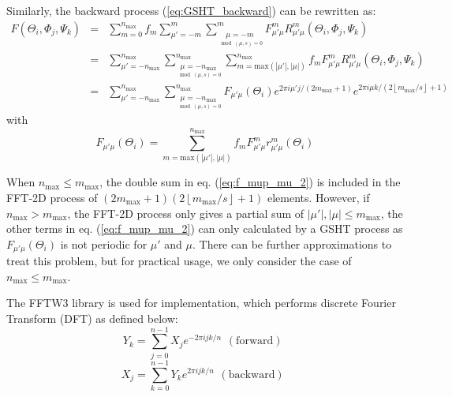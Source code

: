 Similarly, the backward process (\ref{eq:GSHT_backward}) can be rewritten
as:
\begin{eqnarray}
F(\Theta_{i},\Phi_{j},\Psi_{k}) & = & \sum_{m=0}^{n_{\mathrm{max}}}f_{m}\sum_{\mu'=-m}^{m}\sum_{\underset{\mod(\mu,s)=0}{\mu=-m}}^{m}F_{\mu'\mu}^{m}R_{\mu'\mu}^{m}(\Theta_{i},\Phi_{j},\Psi_{k})\label{eq:f_mup_mu_2}\\
 & = & \sum_{\mu'=-n_{\mathrm{max}}}^{n_{\mathrm{max}}}\sum_{\underset{\mod(\mu,s)=0}{\mu=-n_{\mathrm{max}}}}^{n_{\mathrm{max}}}\sum_{m=\mathrm{max}\left(\left|\mu'\right|,\left|\mu\right|\right)}^{n_{\mathrm{max}}}f_{m}F_{\mu'\mu}^{m}R_{\mu'\mu}^{m}(\Theta_{i},\Phi_{j},\Psi_{k})\nonumber \\
 & = & \sum_{\mu'=-n_{\mathrm{max}}}^{n_{\mathrm{max}}}\sum_{\underset{\mod(\mu,s)=0}{\mu=-n_{\mathrm{max}}}}^{n_{\mathrm{max}}}F_{\mu'\mu}(\Theta_{i})e^{2\pi i\mu'j/(2m_{\mathrm{max}}+1)}e^{2\pi i\mu k/(2\left\lfloor m_{\mathrm{max}}/s\right\rfloor +1)}\nonumber 
\end{eqnarray}
with
\begin{equation}
F_{\mu'\mu}(\Theta_{i})=\sum_{m=\mathrm{max}\left(\left|\mu'\right|,\left|\mu\right|\right)}^{n_{\mathrm{max}}}f_{m}F_{\mu'\mu}^{m}r_{\mu'\mu}^{m}(\Theta_{i})\label{eq:f_mup_mu_3}
\end{equation}

When
$n_{\max}\leq m_{\max}$, the double sum in eq. (\ref{eq:f_mup_mu_2})
is included in the \acs{FFT}-2D process of $\left(2m_{\mathrm{max}}+1\right)\left(2\left\lfloor m_{\mathrm{max}}/s\right\rfloor +1\right)$
elements. However, if $n_{\max}>m_{\max}$, the \acs{FFT}-2D process
only gives a partial sum of $\left|\mu'\right|,\left|\mu\right|\leq m_{\max}$,
the other terms in eq. (\ref{eq:f_mup_mu_2}) can only calculated
by a \acs{GSHT} process as $F_{\mu'\mu}(\Theta_{i})$ is not periodic
for $\mu'$ and $\mu$. There can be further approximations to treat
this problem, but for practical usage, we only consider the case of
$n_{\max}\leq m_{\max}$.

The FFTW3 library \citep{FFTW3} is used for implementation, which
performs discrete Fourier Transform (\acs{DFT}) as defined below:
\begin{equation}
Y_{k}=\sum_{j=0}^{n-1}X_{j}e^{-2\pi ijk/n}\begin{array}{c}
\mathrm{(forward)}\end{array}\label{eq:fftw3-fwd}
\end{equation}
\begin{equation}
X_{j}=\sum_{k=0}^{n-1}Y_{k}e^{2\pi ijk/n}\begin{array}{c}
\mathrm{(backward)}\end{array}\label{eq:fftw3-bwd}
\end{equation}

